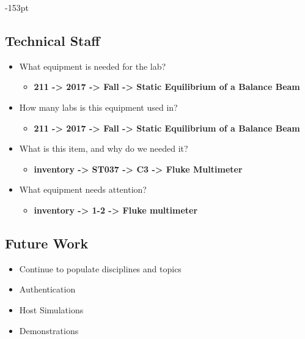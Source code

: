 \begin{adjustwidth}{}{-153pt}
\subsection{\bf Technical Staff}
\begin{itemize}
\item What equipment is needed for the lab?
	\begin{itemize} \item {\bf 211 -> 2017 -> Fall -> Static Equilibrium of a Balance Beam} \end{itemize}
\item How many labs is this equipment used in?
	\begin{itemize} \item {\bf 211 -> 2017 -> Fall -> Static Equilibrium of a Balance Beam} \end{itemize}
\item What is this item, and why do we needed it?
	\begin{itemize} \item {\bf inventory -> ST037 -> C3 -> Fluke Multimeter } \end{itemize}
\item What equipment needs attention?
	\begin{itemize} \item {\bf inventory -> 1-2 -> Fluke multimeter} \end{itemize}
\end{itemize}

\subsection{\bf Future Work}
\begin{itemize}
\item Continue to populate disciplines and topics
\item Authentication
\item Host Simulations
\item Demonstrations
\end{itemize}

\end{adjustwidth}
